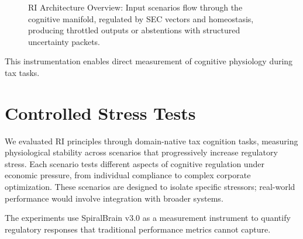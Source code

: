 \documentclass[12pt,a4paper]{article}
\begin{document}
\begin{figure}[H]
\centering


\caption{RI Architecture Overview: Input scenarios flow through the cognitive manifold, regulated by SEC vectors and homeostasis, producing throttled outputs or abstentions with structured uncertainty packets.}
\label{fig:ri_architecture}
\end{figure}


This instrumentation enables direct measurement of cognitive physiology during tax tasks.

\section{Controlled Stress Tests}

We evaluated RI principles through domain-native tax cognition tasks, measuring physiological stability across scenarios that progressively increase regulatory stress. Each scenario tests different aspects of cognitive regulation under economic pressure, from individual compliance to complex corporate optimization. These scenarios are designed to isolate specific stressors; real-world performance would involve integration with broader systems.

The experiments use SpiralBrain v3.0 as a measurement instrument to quantify regulatory responses that traditional performance metrics cannot capture.
\end{document}

